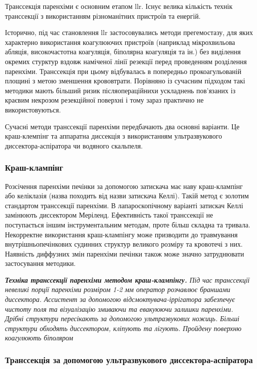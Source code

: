 \begin{refsection}
Транссекція паренхіми є основним етапом \acrshort{llr}. Існує велика кількість технік транссекції з використанням різноманітних пристроїв та енергій. 

Історично, під час становлення \acrshort{llr} застосовувались методи прегемостазу, для яких характерно використання коагулюючих пристроїв (наприклад мікрохвильова абляція, високочастотна коагуляція, біполярна коагуляція та ін.) без виділення окремих стурктур вздовж наміченої лінії резекції перед проведенням розділення паренхіми. Транссекція при цьому відбувалась в попередньо прокоагульованій площині з метою зменшення крововтрати. Порівняно із сучасним підходом такі методики мають більший ризик післяопераційнихи ускладнень пов'язаних із краєвим некрозом резекційної поверхні і тому зараз практично не використовуються.

Сучасні методи транссекції паренхіми передбачають два основні варіанти. Це краш-клемпінг та аппаратна диссекція з використанням ультразвукового диссектора-аспіратора чи водяного скальпеля.

\subsubsection{Краш-клампінг}

Розсічення паренхіми печінки за допомогою затискача має наву краш-клампінг або келіклазія (назва походить від назви затискача Келлі). Такій метод є золотим стандартом транссекції паренхіми. В лапароскопічному варіанті затискач Келлі замінюють диссектором Меріленд. Ефективність такої транссекції не поступається іншим інструментальним методам, проте більш складна та тривала. Некорректне використання краш-клампінгу може призводити до травмування внутрішньопечінкових судинних структур великого розміру та кровотечі з них. Наявність диффузних змін паренхіми печінки також може значно затруднювати застосування методики.

\textit{ \textbf{Техніка транссекції паренхіми методом краш-клампінгу.} Під час транссекції невеликі порції паренхіми розміром 1-2 мм оператор розчавлює браншами диссектора. Ассистент за допомогою від\-смок\-ту\-ва\-ча-\-іррігатора забезпечує чистоту поля та візуалізацію змиваючи та евакуюючи залишки паренхіми. Дрібні структури пересікають за допомогою ультразвукових ножиць. Більші структури обходять диссектором, кліпують та лігують. Пройдену поверхню коагулюють біполяром}

\subsubsection{Транссекція за допомогою ультразвукового диссектора-аспіратора}


\end{refsection}

